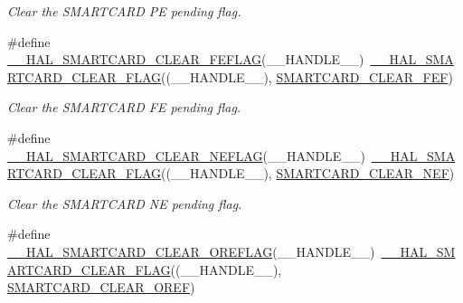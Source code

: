\begin{DoxyCompactItemize}
\begin{DoxyCompactList}\small\item\em Clear the S\+M\+A\+R\+T\+C\+A\+RD PE pending flag. \end{DoxyCompactList}\item 
\#define \hyperlink{group___s_m_a_r_t_c_a_r_d___exported___macros_gac6c4cf3895f565304c68faf23139a533}{\+\_\+\+\_\+\+H\+A\+L\+\_\+\+S\+M\+A\+R\+T\+C\+A\+R\+D\+\_\+\+C\+L\+E\+A\+R\+\_\+\+F\+E\+F\+L\+AG}(\+\_\+\+\_\+\+H\+A\+N\+D\+L\+E\+\_\+\+\_\+)~\hyperlink{group___s_m_a_r_t_c_a_r_d___exported___macros_gab40a9ea5252be0340f074b1cab9c2264}{\+\_\+\+\_\+\+H\+A\+L\+\_\+\+S\+M\+A\+R\+T\+C\+A\+R\+D\+\_\+\+C\+L\+E\+A\+R\+\_\+\+F\+L\+AG}((\+\_\+\+\_\+\+H\+A\+N\+D\+L\+E\+\_\+\+\_\+), \hyperlink{group___s_m_a_r_t_c_a_r_d___i_t___c_l_e_a_r___flags_ga3aa5dfa08809a2c1e8cb9f44d3132cc5}{S\+M\+A\+R\+T\+C\+A\+R\+D\+\_\+\+C\+L\+E\+A\+R\+\_\+\+F\+EF})
\begin{DoxyCompactList}\small\item\em Clear the S\+M\+A\+R\+T\+C\+A\+RD FE pending flag. \end{DoxyCompactList}\item 
\#define \hyperlink{group___s_m_a_r_t_c_a_r_d___exported___macros_gaa6e054a509676625edc0dfa060f1a742}{\+\_\+\+\_\+\+H\+A\+L\+\_\+\+S\+M\+A\+R\+T\+C\+A\+R\+D\+\_\+\+C\+L\+E\+A\+R\+\_\+\+N\+E\+F\+L\+AG}(\+\_\+\+\_\+\+H\+A\+N\+D\+L\+E\+\_\+\+\_\+)~\hyperlink{group___s_m_a_r_t_c_a_r_d___exported___macros_gab40a9ea5252be0340f074b1cab9c2264}{\+\_\+\+\_\+\+H\+A\+L\+\_\+\+S\+M\+A\+R\+T\+C\+A\+R\+D\+\_\+\+C\+L\+E\+A\+R\+\_\+\+F\+L\+AG}((\+\_\+\+\_\+\+H\+A\+N\+D\+L\+E\+\_\+\+\_\+), \hyperlink{group___s_m_a_r_t_c_a_r_d___i_t___c_l_e_a_r___flags_gad462b01ea8cec6eee50e467cec74d864}{S\+M\+A\+R\+T\+C\+A\+R\+D\+\_\+\+C\+L\+E\+A\+R\+\_\+\+N\+EF})
\begin{DoxyCompactList}\small\item\em Clear the S\+M\+A\+R\+T\+C\+A\+RD NE pending flag. \end{DoxyCompactList}\item 
\#define \hyperlink{group___s_m_a_r_t_c_a_r_d___exported___macros_gaa645ab03b85a13098a4e597f525e9f02}{\+\_\+\+\_\+\+H\+A\+L\+\_\+\+S\+M\+A\+R\+T\+C\+A\+R\+D\+\_\+\+C\+L\+E\+A\+R\+\_\+\+O\+R\+E\+F\+L\+AG}(\+\_\+\+\_\+\+H\+A\+N\+D\+L\+E\+\_\+\+\_\+)~\hyperlink{group___s_m_a_r_t_c_a_r_d___exported___macros_gab40a9ea5252be0340f074b1cab9c2264}{\+\_\+\+\_\+\+H\+A\+L\+\_\+\+S\+M\+A\+R\+T\+C\+A\+R\+D\+\_\+\+C\+L\+E\+A\+R\+\_\+\+F\+L\+AG}((\+\_\+\+\_\+\+H\+A\+N\+D\+L\+E\+\_\+\+\_\+), \hyperlink{group___s_m_a_r_t_c_a_r_d___i_t___c_l_e_a_r___flags_ga8ea1dbe61667748016c1d54bb7192f3f}{S\+M\+A\+R\+T\+C\+A\+R\+D\+\_\+\+C\+L\+E\+A\+R\+\_\+\+O\+R\+EF})

\end{DoxyCompactItemize}
